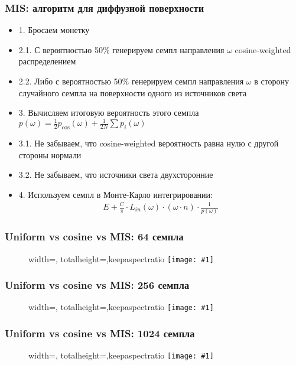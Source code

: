 \documentclass[handout,10pt]{beamer}
\newcommand{\slideimage}[1]{
  \begin{figure}
    \begin{adjustbox}{width=\textwidth, totalheight=\textheight-2\baselineskip-2\baselineskip,keepaspectratio}
      \texttt{[image: \#1]}
    \end{adjustbox}
  \end{figure}
}
\begin{document}
\begin{frame}
\frametitle{MIS: алгоритм для диффузной поверхности}
\begin{itemize}
\item 1. Бросаем монетку
\pause
\item 2.1. С вероятностью 50\% генерируем семпл направления \begin{math}\omega\end{math} cosine-weighted распределением
\pause
\item 2.2. Либо с вероятностью 50\% генерируем семпл направления \begin{math}\omega\end{math} в сторону случайного семпла на поверхности одного из источников света
\pause
\item 3. Вычисляем итоговую вероятность этого семпла \begin{math}p(\omega) = \frac{1}{2}p_{\cos}(\omega) + \frac{1}{2N}\sum p_i(\omega)\end{math}
\pause
\item 3.1. Не забываем, что cosine-weighted вероятность равна нулю с другой стороны нормали
\pause
\item 3.2. Не забываем, что источники света двухсторонние
\pause
\item 4. Используем семпл в Монте-Карло интегрировании:
\begin{gather*}
E + \frac{C}{\pi} \cdot L_{in}(\omega) \cdot (\omega \cdot n) \cdot \frac{1}{p(\omega)}
\end{gather*}
\end{itemize}
\end{frame}

\begin{frame}
\frametitle{Uniform vs cosine vs MIS: 64 семпла}
\slideimage{mis_64.png}
\end{frame}

\begin{frame}
\frametitle{Uniform vs cosine vs MIS: 256 семпла}
\slideimage{mis_256.png}
\end{frame}

\begin{frame}
\frametitle{Uniform vs cosine vs MIS: 1024 семпла}
\slideimage{mis_1024.png}
\end{frame}
\end{document}
